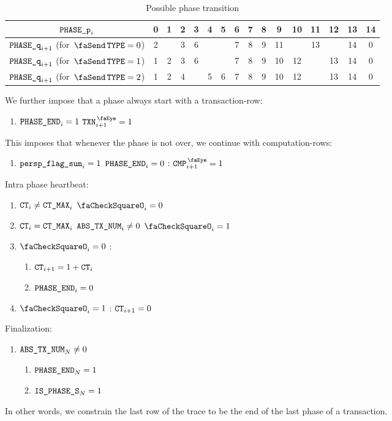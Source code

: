 \begin{table}[h]
    \centering
    \begin{tabular}{|c|c|c|c|c|c|c|c|c|c|c|c|c|c|c|c|} \hline
        $\texttt{PHASE\_p}_{i}$                         & 0 & 1 & 2 & 3 & 4 & 5 & 6 & 7 & 8 & 9  & 10 & 11 & 12 & 13 & 14 \\ \hline \hline
        $\texttt{PHASE\_q}_{i + 1}$ (for $\txType = 0$) & 2 &   & 3 & 6 &   &   & 7 & 8 & 9 & 11 &    & 13 &    & 14 & 0  \\ \hline
        $\texttt{PHASE\_q}_{i + 1}$ (for $\txType = 1$) & 1 & 2 & 3 & 6 &   &   & 7 & 8 & 9 & 10 & 12 &    & 13 & 14 & 0  \\ \hline
        $\texttt{PHASE\_q}_{i + 1}$ (for $\txType = 2$) & 1 & 2 & 4 &   & 5 & 6 & 7 & 8 & 9 & 10 & 12 &    & 13 & 14 & 0  \\ \hline
    \end{tabular}
    \caption{Possible phase transition}
    \label{tab:Possible phase transition}
\end{table}

We further impose that a phase always start with a transaction-row:
\begin{enumerate}[resume]
    \item $\texttt{PHASE\_END}_{i} = 1$ \Then $\isTxn_{i+1} = 1$
\end{enumerate}
This imposes that whenever the phase is not over, we continue with computation-rows:
\begin{enumerate}[resume]
    \item \If $\texttt{persp\_flag\_sum}_{i} =1$ \et $\texttt{PHASE\_END}_{i} = 0$ \Then: $\isCmp_{i+1} = 1$
\end{enumerate}

Intra phase heartbeat:
\begin{enumerate}[resume]
    \item \If $\texttt{CT}_{i} \neq \texttt{CT\_MAX}_{i}$ \Then $\done_{i} = 0$
    \item \If $\texttt{CT}_{i} =    \texttt{CT\_MAX}_{i}$ \et $\texttt{ABS\_TX\_NUM}_{i} \neq 0$ \Then $\done_{i} = 1$
    \item \If $\done_{i} = 0$ \Then:
    \begin{enumerate}
        \item $\texttt{CT}_{i+1} = 1 + \texttt{CT}_{i}$ 
        \item $\texttt{PHASE\_END}_{i} = 0$
    \end{enumerate}
    \item \If $\done_{i} = 1$ \Then: $\texttt{CT}_{i+1} = 0$
\end{enumerate}

Finalization:
\begin{enumerate}[resume]
    \item \If $\texttt{ABS\_TX\_NUM}_{N} \neq 0$ \Then
    \begin{enumerate}
        \item $\texttt{PHASE\_END}_{N} = 1$
        \item $\texttt{IS\_PHASE\_S}_{N} = 1$ 
    \end{enumerate}
\end{enumerate}
In other words, we constrain the last row of the trace to be the end of the last phase of a transaction.
